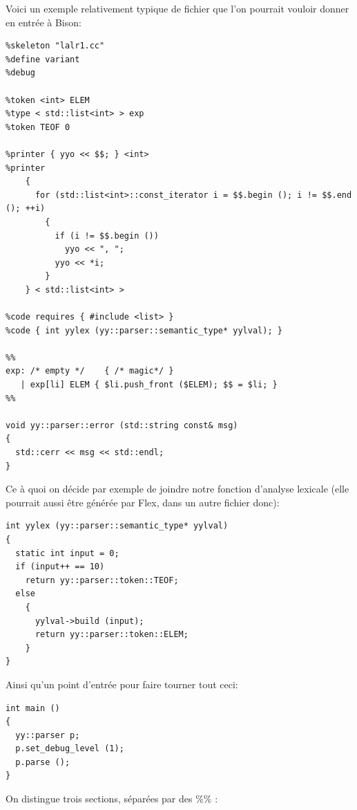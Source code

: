 \documentclass[a4paper,11pt,twoside,final]{article}
\begin{document}
  Voici un exemple relativement typique de fichier que l'on pourrait vouloir
  donner en entrée à Bison:

  \begin{verbatim}
%skeleton "lalr1.cc"
%define variant
%debug

%token <int> ELEM
%type < std::list<int> > exp
%token TEOF 0

%printer { yyo << $$; } <int>
%printer
    {
      for (std::list<int>::const_iterator i = $$.begin (); i != $$.end (); ++i)
        {
          if (i != $$.begin ())
            yyo << ", ";
          yyo << *i;
        }
    } < std::list<int> >

%code requires { #include <list> }
%code { int yylex (yy::parser::semantic_type* yylval); }

%%
exp: /* empty */    { /* magic*/ }
   | exp[li] ELEM { $li.push_front ($ELEM); $$ = $li; }
%%

void yy::parser::error (std::string const& msg)
{
  std::cerr << msg << std::endl;
}
  \end{verbatim}

  Ce à quoi on décide par exemple de joindre notre fonction d'analyse lexicale
  (elle pourrait aussi être générée par Flex, dans un autre fichier donc):

  \begin{verbatim}
int yylex (yy::parser::semantic_type* yylval)
{
  static int input = 0;
  if (input++ == 10)
    return yy::parser::token::TEOF;
  else
    {
      yylval->build (input);
      return yy::parser::token::ELEM;
    }
}
  \end{verbatim}

  Ainsi qu'un point d'entrée pour faire tourner tout ceci:

  \begin{verbatim}
int main ()
{
  yy::parser p;
  p.set_debug_level (1);
  p.parse ();
}
  \end{verbatim}

  On distingue trois sections, séparées par des \og \%\% \fg:
\end{document}
